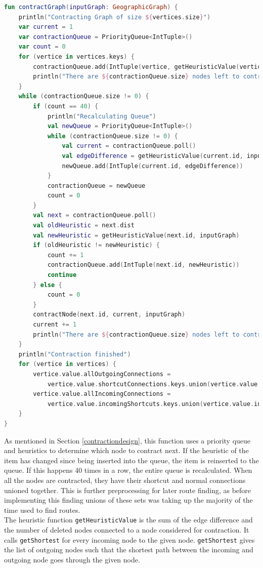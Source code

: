 \documentclass[11pt,twoside,a4paper]{article}
\begin{document}
\begin{lstlisting}[language=kotlin]
fun contractGraph(inputGraph: GeographicGraph) {
    println("Contracting Graph of size ${vertices.size}")
    var current = 1
    var contractionQueue = PriorityQueue<IntTuple>()
    var count = 0
    for (vertice in vertices.keys) {
        contractionQueue.add(IntTuple(vertice, getHeuristicValue(vertice, inputGraph)))
        println("There are ${contractionQueue.size} nodes left to contract")
    }
    while (contractionQueue.size != 0) {
        if (count == 40) {
            println("Recalculating Queue")
            val newQueue = PriorityQueue<IntTuple>()
            while (contractionQueue.size != 0) {
                val current = contractionQueue.poll()
                val edgeDifference = getHeuristicValue(current.id, inputGraph)
                newQueue.add(IntTuple(current.id, edgeDifference))
            }
            contractionQueue = newQueue
            count = 0
        }
        val next = contractionQueue.poll()
        val oldHeuristic = next.dist
        val newHeuristic = getHeuristicValue(next.id, inputGraph)
        if (oldHeuristic != newHeuristic) {
            count += 1
            contractionQueue.add(IntTuple(next.id, newHeuristic))
            continue
        } else {
            count = 0
        }
        contractNode(next.id, current, inputGraph)
        current += 1
        println("There are ${contractionQueue.size} nodes left to contract")
    }
    println("Contraction finished")
    for (vertice in vertices) {
        vertice.value.allOutgoingConnections =
            vertice.value.shortcutConnections.keys.union(vertice.value.connections.keys).toList()
        vertice.value.allIncomingConnections =
            vertice.value.incomingShortcuts.keys.union(vertice.value.incomingConnections.keys).toList()
    }
}
\end{lstlisting}
As mentioned in Section \ref{contractiondesign}, this function uses a priority queue and heuristics to determine which node to contract next. If the heuristic of the item has changed since being inserted into the queue,
the item is reinserted to the queue. If this happens 40 times in a row, the entire queue is recalculated. When all the nodes are contracted, they have their shortcut and normal connections unioned together. This is further preprocessing for later route finding, as before implementing this
finding unions of these sets was taking up the majority of the time used to find routes. \\
The heuristic function \texttt{getHeuristicValue} is the sum of the edge difference and the number of deleted nodes connected to a node considered for contraction. It calls \texttt{getShortest} for every incoming node to the given node. \texttt{getShortest} gives the list of outgoing nodes such that the shortest path between the incoming and outgoing node goes through the given node. 
\end{document}
